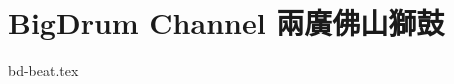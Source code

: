 \documentclass[11pt]{article}
\begin{document}
\section*{BigDrum Channel 兩廣佛山獅鼓}
{bd-beat.tex}
\end{document}
